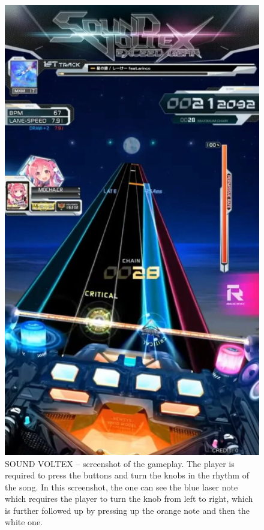 \begin{figure}[h]
    \centering\includegraphics[scale=0.4]{obrazki/sdvx.png}
    \caption{SOUND VOLTEX -- screenshot of the gameplay. The player is required to press the buttons and turn the knobs in the rhythm of the song. In this screenshot, the one can see the blue laser note which requires the player to turn the knob from left to right, which is further followed up by pressing up the orange note and then the white one. \cite{sdvx}}
    \label{fig:sdvx2}
\end{figure}

